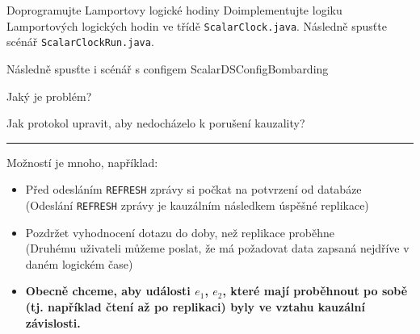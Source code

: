 \documentclass[usenames,dvipsnames,9pt]{beamer}
\begin{document}
{
\begin{frame}
    \begin{block}{Doprogramujte Lamportovy logické hodiny}
        Doimplementujte logiku Lamportových logických hodin ve třídě \texttt{ScalarClock.java}. Následně spusťte scénář \texttt{ScalarClockRun.java}.
  \end{block}
    \begin{center}
        {\LARGE Následně spusťte i scénář s configem \small ScalarDSConfigBombarding}

        \vspace{2em}
        \pause

        {\LARGE Jaký je problém?}
        
    \end{center}

    
  
\end{frame}
}

\begin{frame}
  \begin{center}
    \LARGE Jak protokol upravit, aby nedocházelo k porušení kauzality?
  \end{center}

  \pause\vspace{1em}\hrule\vspace{1em}
  Možností je mnoho, například:
  \begin{itemize}
    \pause\item Před odesláním \texttt{REFRESH} zprávy si počkat na potvrzení od databáze \\
                {\small (Odeslání \texttt{REFRESH} zprávy je kauzálním následkem úspěšné replikace)}
    \pause\item Pozdržet vyhodnocení dotazu do doby, než replikace proběhne \\
                {\small (Druhému uživateli můžeme poslat, že má požadovat data zapsaná nejdříve v daném logickém čase)}
  \end{itemize}
  \pause
  \begin{itemize}
    \item[\faWarning] \bf Obecně chceme, aby události $e_1$, $e_2$, které mají proběhnout po sobě (tj. například čtení až po replikaci) byly ve vztahu kauzální závislosti.
  \end{itemize}
\end{frame}
\end{document}
